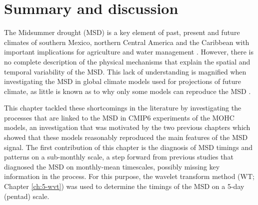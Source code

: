 
\section{Summary and discussion}\label{sq:sumdiscuss}

The Midsummer drought (MSD) is a key element of past, present and future climates of southern Mexico, northern Central America and the Caribbean with important implications for agriculture and water management \citep{hellin2017,de2018,harvey2018}. However, there is no complete description of the physical mechanisms that explain the spatial and temporal variability of the MSD. This lack of understanding is magnified when investigating the MSD in global climate models used for projections of future climate, as little is known as to why only some models can reproduce the MSD \citep{ryu2014}.


This chapter tackled these shortcomings in the literature by investigating the processes that are linked to the MSD in CMIP6 experiments of the MOHC models, an investigation that was motivated by the two previous chapters which showed that these models reasonably reproduced the main features of the MSD signal.
The first contribution of this chapter is the diagnosis of MSD timings and patterns on a sub-monthly scale, a step forward from previous studies that diagnosed the MSD on monthly-mean timescales, possibly missing key information in the process. 
For this purpose, the wavelet transform method (WT; Chapter \ref{ch:5-wvt}) was used to determine the timings of the MSD on a 5-day (pentad) scale. 



